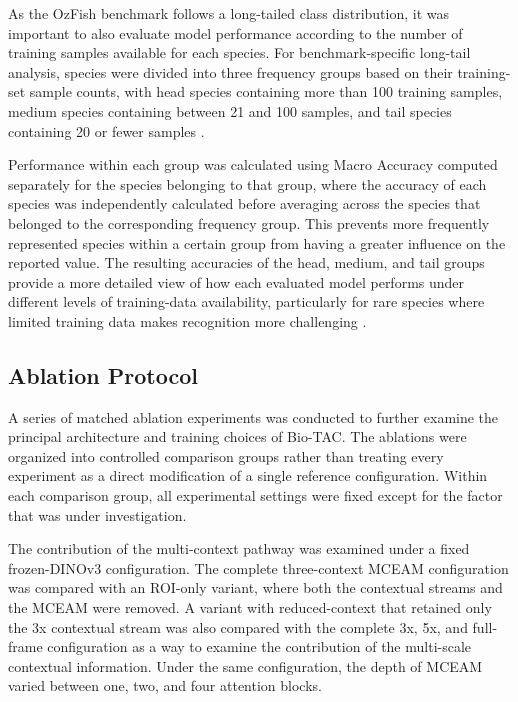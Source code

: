 \documentclass[preprint,12pt]{elsarticle}
\begin{document}
As the OzFish benchmark follows a long-tailed class distribution, it was
important to also evaluate model performance according to the number of
training samples available for each species. For benchmark-specific
long-tail analysis, species were divided into three frequency groups
based on their training-set sample counts, with head species containing
more than 100 training samples, medium species containing between 21 and
100 samples, and tail species containing 20 or fewer samples
\citep{ref16}.

Performance within each group was calculated using Macro Accuracy
computed separately for the species belonging to that group, where the
accuracy of each species was independently calculated before averaging
across the species that belonged to the corresponding frequency group.
This prevents more frequently represented species within a certain group
from having a greater influence on the reported value. The resulting
accuracies of the head, medium, and tail groups provide a more detailed
view of how each evaluated model performs under different levels of
training-data availability, particularly for rare species where limited
training data makes recognition more challenging
\citep{ref15,ref16}.

\subsection{Ablation Protocol}\label{ablation-protocol}

A series of matched ablation experiments was conducted to further
examine the principal architecture and training choices of Bio-TAC.
The ablations were organized into controlled comparison groups rather
than treating every experiment as a direct modification of a single
reference configuration. Within each comparison group, all experimental
settings were fixed except for the factor that was under investigation.

The contribution of the multi-context pathway was examined under a fixed
frozen-DINOv3 configuration. The complete three-context MCEAM
configuration \citep{ref26} was compared with an
ROI-only variant, where both the contextual streams and the MCEAM were
removed. A variant with reduced-context that retained only the 3x
contextual stream was also compared with the complete 3x, 5x, and
full-frame configuration as a way to examine the contribution of the
multi-scale contextual information. Under the same configuration, the
depth of MCEAM varied between one, two, and four attention blocks.
\end{document}
